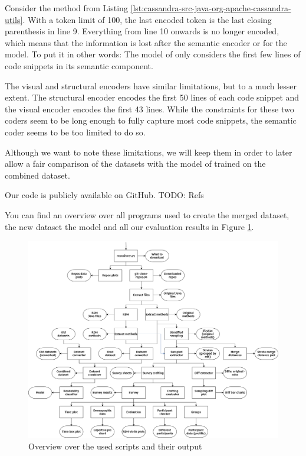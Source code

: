 \documentclass[%
class=scrreprt,
chapterprefix=false,%
open=right,%
twoside=false,%
paper=a4,%
logofile={Logo\_zentral\_farbig\_EN.png},%
thesistype=master,%
UKenglish,%
]{se2thesis}
\theoremstyle{definition}
\begin{document}
	Consider the method from Listing \ref{lst:cassandra-src-java-org-apache-cassandra-utils}. With a token limit of 100, the last encoded token is the last closing parenthesis in line 9. Everything from line 10 onwards is no longer encoded, which means that the information is lost after the semantic encoder or for the model. To put it in other words: The model of \citeauthor{mi2022towards} only considers the first few lines of code snippets in its semantic component.
	
	The visual and structural encoders have similar limitations, but to a much lesser extent. The structural encoder encodes the first 50 lines of each code snippet and the visual encoder encodes the first 43 lines. While the constraints for these two coders seem to be long enough to fully capture most code snippets, the semantic coder seems to be too limited to do so.

	Although we want to note these limitations, we will keep them in order to later allow a fair comparison of the datasets with the model of \citeauthor{mi2022towards} trained on the combined dataset.	
	
	Our code is publicly available on GitHub. TODO: Refs
	
	You can find an overview over all programs used to create the merged dataset, the new dataset the model and all our evaluation results in Figure \ref{fig:scripts_pipline}.
	
	\begin{figure}[t]
		\centering
		\includegraphics[width=\textwidth]{img/scripts_pipeline.png}
		\caption{Overview over the used scripts and their output}
		\label{fig:scripts_pipline}
	\end{figure}
	
\end{document}
